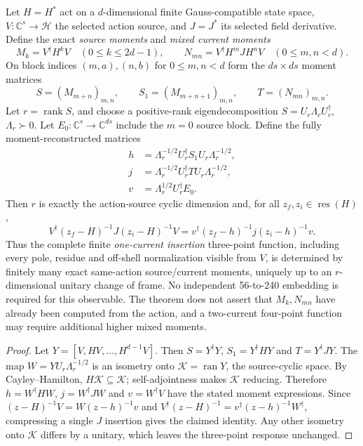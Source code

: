 \documentclass[12pt,a4paper]{article}
\begin{document}
\begin{theorem}
\label{p10:thm:v375-mixed-moment-current-reconstruction}
Let $H=H^*$ act on a $d$-dimensional finite Gauss-compatible
state space, $V:\mathbb C^s\to\mathcal H$ the selected action source,
and $J=J^*$ its selected field derivative. Define the exact
\emph{source moments} and \emph{mixed current moments}
\[
 M_k=V^\dagger H^kV\quad(0\le k\le2d-1),\qquad
 N_{mn}=V^\dagger H^mJH^nV\quad(0\le m,n<d).
\]
On block indices $(m,a),(n,b)$ for $0\le m,n<d$ form the
$d s\times d s$ moment matrices
\[
 S=(M_{m+n})_{m,n},\qquad S_1=(M_{m+n+1})_{m,n},
 \qquad T=(N_{mn})_{m,n}.
\]
Let $r=\operatorname{rank}S$, and choose a positive-rank eigendecomposition
$S=U_r\Lambda_rU_r^\dagger$, $\Lambda_r\succ0$.
Let $E_0:\mathbb C^s\to\mathbb C^{ds}$ include the $m=0$
source block. Define the fully moment-reconstructed matrices
\[
\boxed{\begin{aligned}
 h&=\Lambda_r^{-1/2}U_r^\dagger S_1U_r\Lambda_r^{-1/2},\\
 j&=\Lambda_r^{-1/2}U_r^\dagger TU_r\Lambda_r^{-1/2},\\
 v&=\Lambda_r^{1/2}U_r^\dagger E_0.
\end{aligned}}
\]
Then $r$ is exactly the action-source cyclic dimension and, for
all $z_f,z_i\in\operatorname{res}(H)$,
\[
\boxed{V^\dagger(z_f-H)^{-1}J(z_i-H)^{-1}V
 =v^\dagger(z_f-h)^{-1}j(z_i-h)^{-1}v.}
\]
Thus the complete finite \emph{one-current insertion} three-point
function, including every pole, residue and off-shell normalization
visible from $V$, is determined by finitely many exact same-action
source/current moments, uniquely up to an $r$-dimensional unitary
change of frame. No independent 56-to-240 embedding is required
for this observable. The theorem does not assert that $M_k,N_{mn}$
have already been computed from the action, and a two-current
four-point function may require additional higher mixed moments.
\end{theorem}
\begin{proof}
Let $Y=[V,HV,\ldots,H^{d-1}V]$. Then
$S=Y^\dagger Y$, $S_1=Y^\dagger HY$ and $T=Y^\dagger JY$.
The map $W=Y U_r\Lambda_r^{-1/2}$ is an isometry onto
$\mathcal K=\operatorname{ran}Y$, the source-cyclic space.
By Cayley--Hamilton, $H\mathcal K\subseteq\mathcal K$;
self-adjointness makes $\mathcal K$ reducing.
Therefore $h=W^\dagger HW$, $j=W^\dagger JW$ and
$v=W^\dagger V$ have the stated moment expressions. Since
$(z-H)^{-1}V=W(z-h)^{-1}v$ and
$V^\dagger(z-H)^{-1}=v^\dagger(z-h)^{-1}W^\dagger$,
compressing a single $J$ insertion gives the claimed identity.
Any other isometry onto $\mathcal K$ differs by a unitary, which
leaves the three-point response unchanged.
\end{proof}
\end{document}
